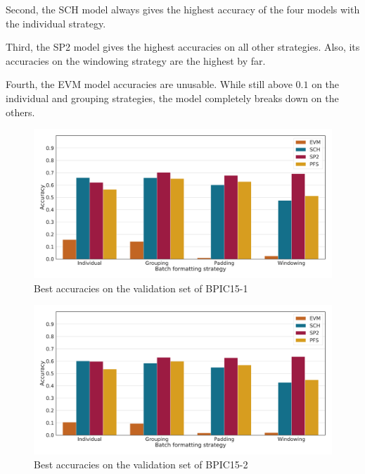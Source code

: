Second, the SCH model always gives the highest accuracy of the four models with the individual strategy.

Third, the SP2 model gives the highest accuracies on all other strategies.
Also, its accuracies on the windowing strategy are the highest by far.

Fourth, the EVM model accuracies are unusable. While still above $0.1$ on the individual and grouping strategies, the model completely breaks down on the others.

\begin{figure}
    \centering
    \includegraphics[width=\textwidth]{gfx/bpic2015_1/accuracies.pdf}
    \caption{Best accuracies on the validation set of BPIC15-1}
    \label{fig:max-accuracies-bpic2015-1}
\end{figure}
\begin{figure}
    \centering
    \includegraphics[width=\textwidth]{gfx/bpic2015_2/accuracies.pdf}
    \caption{Best accuracies on the validation set of BPIC15-2}
    \label{fig:max-accuracies-bpic2015-2}
\end{figure}
